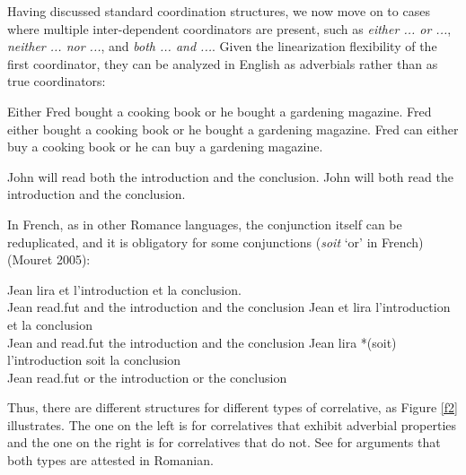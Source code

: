 \documentclass[output=paper]{langsci/langscibook}
\begin{document}
Having discussed standard coordination structures, we now move on to cases where
multiple inter-dependent coordinators are present, such as {\it either ... or ...},
{\it neither ... nor ...}, 
and {\it both ... and ...}. Given the linearization flexibility of the first coordinator, they  can be analyzed in English as adverbials rather than as true coordinators:

\begin{exe}
 \ex
\begin{xlista}
\ex  Either Fred bought a cooking book or he bought a gardening magazine.
\ex  Fred either bought a cooking book or he bought a gardening magazine.
\ex  Fred can either buy a cooking book or he can buy a gardening magazine.
\end{xlista}
\end{exe}


\begin{exe}
 \ex
\begin{xlista}
\ex John will read both the introduction and the conclusion.
\ex John will both read the introduction and the conclusion.
\end{xlista}
\end{exe}



\noindent
In French, as in other Romance languages, the conjunction itself can be reduplicated, and it is obligatory for some conjunctions ({\it soit} `or' in French) (Mouret 2005): 

\begin{exe}
 \ex
\begin{xlista}
\ex Jean lira et l'introduction et la conclusion.\\
    Jean read.fut and the introduction and the conclusion
\ex *Jean et lira l'introduction et la conclusion\\
    Jean and read.fut the introduction and the conclusion
\ex Jean  lira *(soit) l'introduction soit la conclusion\\
    Jean read.fut or the introduction or the conclusion
\end{xlista}
\end{exe}

\noindent
Thus, there are  different structures for different types of correlative, as Figure \ref{f2} illustrates. The one on the left is for correlatives that exhibit adverbial properties and the one on the right is for correlatives that do not.
See \citet{Bilbiie:08} for arguments that both types are attested in Romanian.
\end{document}
